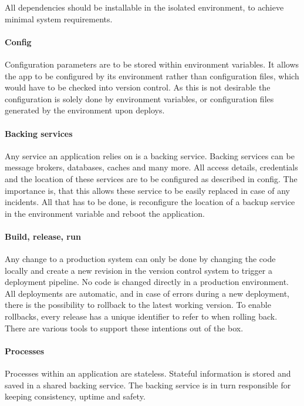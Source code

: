 All dependencies should be installable in the isolated environment, to achieve
minimal system requirements.

\paragraph{Config}
\label{para:12factor:config}

Configuration parameters are to be stored within environment variables. It
allows the app to be configured by its environment rather than configuration
files, which would have to be checked into version control. As this is not
desirable the configuration is solely done by environment variables, or
configuration files generated by the environment upon deploys.

\paragraph{Backing services}

Any service an application relies on is a backing service. Backing services can
be message brokers, databases, caches and many more. All access details,
credentials and the location of these services are to be configured as
described in config. The importance is, that this allows these service to be
easily replaced in case of any incidents. All that has to be done, is
reconfigure the location of a backup service in the environment variable and
reboot the application.

\paragraph{Build, release, run}

Any change to a production system can only be done by changing the code locally
and create a new revision in the version control system to trigger a deployment
pipeline. No code is changed directly in a production environment. All
deployments are automatic, and in case of errors during a new deployment, there
is the possibility to rollback to the latest working version. To enable
rollbacks, every release has a unique identifier to refer to when rolling back.
There are various tools to support these intentions out of the box.

\paragraph{Processes}

Processes within an application are stateless. Stateful information is stored
and saved in a shared backing service. The backing service is in turn
responsible for keeping consistency, uptime and safety.

